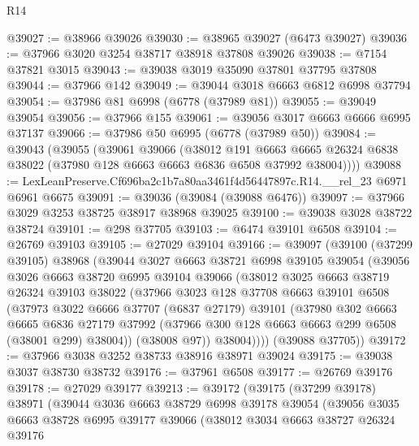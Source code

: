 \begin{lexlean}{R14}
\begin{coremodule}
@39027 := @38966 @39026
@39030 := @38965 @39027 (@6473 @39027)
@39036 := @37966 @3020 @3254 @38717 @38918 @37808 @39026
@39038 := @7154 @37821 @3015
@39043 := @39038 @3019 @35090 @37801 @37795 @37808
@39044 := @37966 @142
@39049 := @39044 @3018 @6663 @6812 @6998 @37794
@39054 := @37986 @81 @6998 (@6778 (@37989 @81))
@39055 := @39049 @39054
@39056 := @37966 @155
@39061 := @39056 @3017 @6663 @6666 @6995 @37137
@39066 := @37986 @50 @6995 (@6778 (@37989 @50))
@39084 := @39043
    (@39055
      (@39061
        @39066
        (@38012
          @191
          @6663
          @6665
          @26324
          @6838
          @38022
          (@37980 @128 @6663 @6663 @6836 @6508 @37992 @38004))))
@39088 := LexLeanPreserve.Cf696ba2c1b7a80aa3461f4d56447897c.R14.__rel_23 @6971 @6961 @6675
@39091 := @39036 (@39084 (@39088 @6476))
@39097 := @37966 @3029 @3253 @38725 @38917 @38968 @39025
@39100 := @39038 @3028 @38722 @38724
@39101 := @298 @37705
@39103 := @6474 @39101 @6508
@39104 := @26769 @39103
@39105 := @27029 @39104
@39166 := @39097
    (@39100
      (@37299 @39105)
      @38968
      (@39044
        @3027
        @6663
        @38721
        @6998
        @39105
        @39054
        (@39056
          @3026
          @6663
          @38720
          @6995
          @39104
          @39066
          (@38012
            @3025
            @6663
            @38719
            @26324
            @39103
            @38022
            (@37966
              @3023
              @128
              @37708
              @6663
              @39101
              @6508
              (@37973
                @3022
                @6666
                @37707
                (@6837 @27179)
                @39101
                (@37980
                  @302
                  @6663
                  @6665
                  @6836
                  @27179
                  @37992
                  (@37966 @300 @128 @6663 @6663 @299 @6508 (@38001 @299) @38004))
                (@38008 @97))
              @38004))))
      (@39088 @37705))
@39172 := @37966 @3038 @3252 @38733 @38916 @38971 @39024
@39175 := @39038 @3037 @38730 @38732
@39176 := @37961 @6508
@39177 := @26769 @39176
@39178 := @27029 @39177
@39213 := @39172
    (@39175
      (@37299 @39178)
      @38971
      (@39044
        @3036
        @6663
        @38729
        @6998
        @39178
        @39054
        (@39056
          @3035
          @6663
          @38728
          @6995
          @39177
          @39066
          (@38012
            @3034
            @6663
            @38727
            @26324
            @39176

\end{coremodule}
\end{lexlean}
